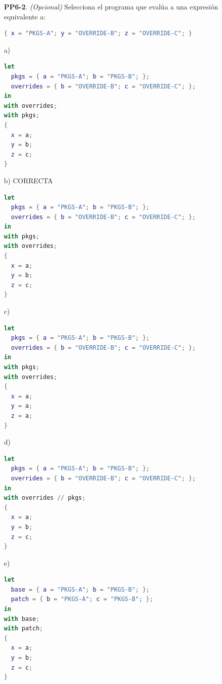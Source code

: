\textbf{PP6-2}. \emph{(Opcional)} Selecciona el programa que evalúa a una expresión equivalente a:

\begin{bloquecodigo}
\begin{lstlisting}[language=nix]
{ x = "PKGS-A"; y = "OVERRIDE-B"; z = "OVERRIDE-C"; }
\end{lstlisting}
\end{bloquecodigo}

\begin{opcion}{a)}
\begin{lstlisting}[language=nix]
let
  pkgs = { a = "PKGS-A"; b = "PKGS-B"; };
  overrides = { b = "OVERRIDE-B"; c = "OVERRIDE-C"; };
in
with overrides;
with pkgs;
{
  x = a;
  y = b;
  z = c;
}
\end{lstlisting}
\end{opcion}

\begin{opcion}{b)}
CORRECTA
\begin{lstlisting}[language=nix]
let
  pkgs = { a = "PKGS-A"; b = "PKGS-B"; };
  overrides = { b = "OVERRIDE-B"; c = "OVERRIDE-C"; };
in
with pkgs;
with overrides;
{
  x = a;
  y = b;
  z = c;
}
\end{lstlisting}
\end{opcion}

\begin{opcion}{c)}
\begin{lstlisting}[language=nix]
let
  pkgs = { a = "PKGS-A"; b = "PKGS-B"; };
  overrides = { b = "OVERRIDE-B"; c = "OVERRIDE-C"; };
in
with pkgs;
with overrides;
{
  x = a;
  y = a;
  z = a;
}
\end{lstlisting}
\end{opcion}

\begin{opcion}{d)}
\begin{lstlisting}[language=nix]
let
  pkgs = { a = "PKGS-A"; b = "PKGS-B"; };
  overrides = { b = "OVERRIDE-B"; c = "OVERRIDE-C"; };
in
with overrides // pkgs;
{
  x = a;
  y = b;
  z = c;
}
\end{lstlisting}
\end{opcion}

\begin{opcion}{e)}
\begin{lstlisting}[language=nix]
let
  base = { a = "PKGS-A"; b = "PKGS-B"; };
  patch = { b = "PKGS-A"; c = "PKGS-B"; };
in
with base;
with patch;
{
  x = a;
  y = b;
  z = c;
}
\end{lstlisting}
\end{opcion}

